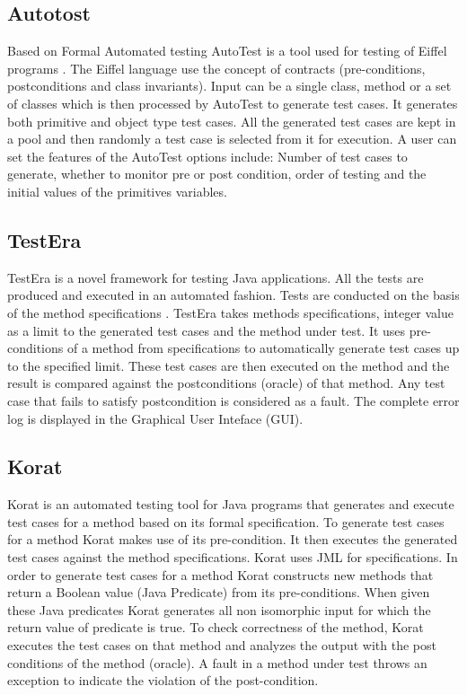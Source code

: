 \subsection{Autotost}
Based on Formal Automated testing AutoTest is a tool used for testing of Eiffel programs \cite{Ciupa2007}. The Eiffel language use the concept of contracts (pre-conditions, postconditions and class invariants). Input can be a single class, method or a set of classes which is then processed by AutoTest to generate test cases. It generates both primitive and object type test cases. All the generated test cases are kept in a pool and then randomly a test case is selected from it for execution. A user can set the features of the AutoTest options include: Number of test cases to generate, whether to monitor pre or post condition, order of testing and the initial values of the primitives variables.

\subsection{TestEra}
TestEra \cite{Khurshid2004} is a novel framework for testing Java applications. All the tests are produced and executed in an automated fashion. Tests are conducted on the basis of the method specifications \cite{Chang1999}. TestEra takes methods specifications, integer value as a limit to the generated test cases and the method under test. It uses pre-conditions of a method from specifications to automatically generate test cases up to the specified limit. These test cases are then executed on the method and the result is compared against the postconditions (oracle) of that method. Any test case that fails to satisfy postcondition is considered as a fault. The complete error log is displayed in the Graphical User Inteface (GUI).

\subsection{Korat}
Korat \cite{Boyapati2002} is an automated testing tool for Java programs that generates and execute test cases for a method based on its formal specification. To generate test cases for a method Korat makes use of its pre-condition. It then executes the generated test cases against the method specifications. Korat uses JML for specifications. In order to generate test cases for a method Korat constructs new methods that return a Boolean value (Java Predicate) from its pre-conditions. When given these Java predicates Korat generates all non isomorphic input for which the return value of predicate is true. To check correctness of the method, Korat executes the test cases on that method and analyzes the output with the post conditions of the method (oracle). A fault in a method under test throws an exception to indicate the violation of the post-condition.

